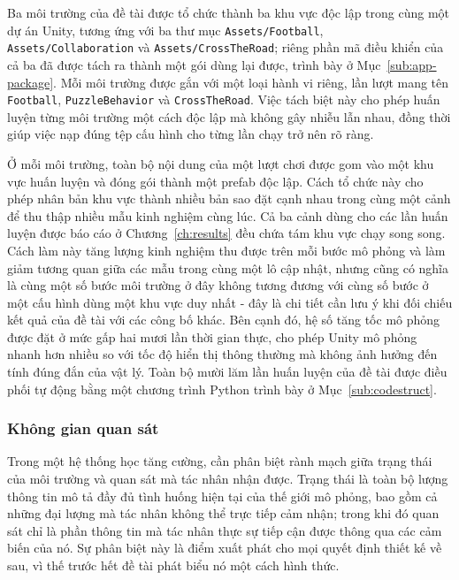 {\sloppy
\indent Ba môi trường của đề tài được tổ chức thành ba khu vực độc lập trong cùng một
dự án Unity, tương ứng với ba thư mục \texttt{Assets/\allowbreak Football},
\texttt{Assets/\allowbreak Collaboration} và \texttt{Assets/\allowbreak CrossTheRoad};
riêng phần mã điều khiển của cả ba đã được tách ra thành một gói dùng lại được, trình
bày ở Mục~\ref{sub:app-package}. Mỗi môi trường được gắn
với một loại hành vi riêng, lần lượt mang tên \texttt{Football}, \texttt{PuzzleBehavior}
và \texttt{CrossTheRoad}. Việc tách biệt này cho phép huấn luyện từng môi trường một
cách độc lập mà không gây nhiễu lẫn nhau, đồng thời giúp việc nạp đúng tệp cấu hình
cho từng lần chạy trở nên rõ ràng.\par}

\indent Ở mỗi môi trường, toàn bộ nội dung của một lượt chơi được gom vào một khu vực
huấn luyện và đóng gói thành một prefab độc lập. Cách tổ chức này cho phép nhân bản
khu vực thành nhiều bản sao đặt cạnh nhau trong cùng một cảnh để thu thập nhiều mẫu
kinh nghiệm cùng lúc. Cả ba cảnh dùng cho các lần huấn luyện được báo cáo ở
Chương~\ref{ch:results} đều chứa tám khu vực chạy song song. Cách làm này tăng lượng
kinh nghiệm thu được trên mỗi bước mô phỏng và làm giảm tương quan giữa các mẫu trong
cùng một lô cập nhật, nhưng cũng có nghĩa là cùng một số bước môi trường ở đây không
tương đương với cùng số bước ở một cấu hình dùng một khu vực duy nhất - đây là chi tiết
cần lưu ý khi đối chiếu kết quả của đề tài với các công bố khác. Bên cạnh đó, hệ số
tăng tốc mô phỏng được đặt ở mức gấp hai mươi lần thời gian thực, cho phép
Unity mô phỏng nhanh hơn nhiều so với tốc độ hiển thị thông thường mà không ảnh hưởng
đến tính đúng đắn của vật lý. Toàn bộ mười lăm lần huấn luyện của đề tài được điều phối
tự động bằng một chương trình Python trình bày ở Mục~\ref{sub:codestruct}.

\subsubsection{Không gian quan sát}
\label{sub:obs-space}
\indent Trong một hệ thống học tăng cường, cần phân biệt rành mạch giữa trạng
thái của môi trường và quan sát mà tác nhân nhận được. Trạng thái là toàn bộ
lượng thông tin mô tả đầy đủ tình huống hiện tại của thế giới mô phỏng, bao gồm cả
những đại lượng mà tác nhân không thể trực tiếp cảm nhận; trong khi đó quan sát chỉ là
phần thông tin mà tác nhân thực sự tiếp cận được thông qua các cảm biến của nó. Sự phân
biệt này là điểm xuất phát cho mọi quyết định thiết kế về sau, vì thế trước hết đề tài
phát biểu nó một cách hình thức.

